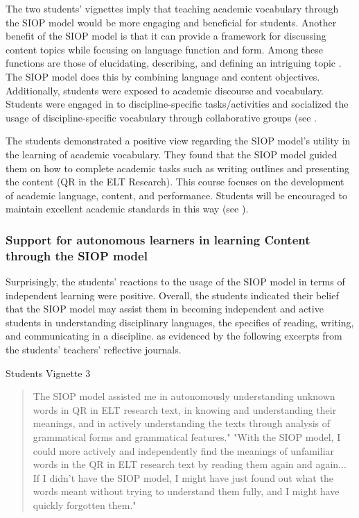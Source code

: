 \documentclass[english]{textolivre}
\begin{document}
The two students' vignettes imply that teaching academic vocabulary through the SIOP model would be more engaging and beneficial for students. Another benefit of the SIOP model is that it can provide a framework for discussing content topics while focusing on language function and form. Among these functions are those of elucidating, describing, and defining an intriguing topic \cite{hansen-thomas_sheltered_2008}. The SIOP model does this by combining language and content objectives. Additionally, students were exposed to academic discourse and vocabulary. Students were engaged in to discipline-specific tasks/activities and socialized the usage of discipline-specific vocabulary through collaborative groups (see \textcite{echevarria_making_2017}.

The students demonstrated a positive view regarding the SIOP model's utility in the learning of academic vocabulary. They found that the SIOP model guided them on how to complete academic tasks such as writing outlines and presenting the content (QR in the ELT Research). This course focuses on the development of academic language, content, and performance. Students will be encouraged to maintain excellent academic standards in this way (see \textcite{hansen-thomas_sheltered_2008}).

\subsubsection{Support for autonomous learners in learning Content through the SIOP model}\label{sec-resumo}
Surprisingly, the students' reactions to the usage of the SIOP model in terms of independent learning were positive. Overall, the students indicated their belief that the SIOP model may assist them in becoming independent and active students in understanding disciplinary languages, the specifics of reading, writing, and communicating in a discipline. as evidenced by the following excerpts from the students' teachers' reflective journals.

Students Vignette 3

\begin{quote}
    The SIOP model assisted me in autonomously understanding unknown words in QR in ELT research text, in knowing and understanding their meanings, and in actively understanding the texts through analysis of grammatical forms and grammatical features." "With the SIOP model, I could more actively and independently find the meanings of unfamiliar words in the QR in ELT research text by reading them again and again... If I didn't have the SIOP model, I might have just found out what the words meant without trying to understand them fully, and I might have quickly forgotten them."
\end{quote}
\end{document}

